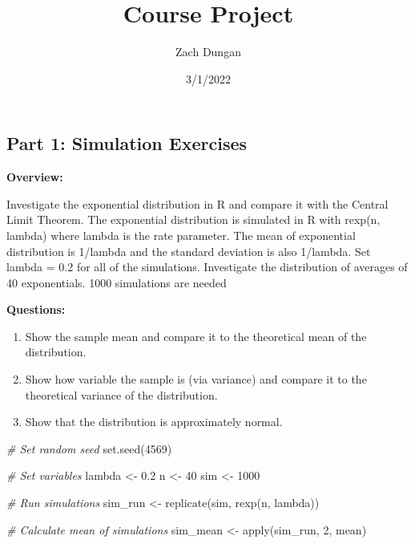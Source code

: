 \documentclass[
]{article}
\title{Course Project}
\author{Zach Dungan}
\date{3/1/2022}
\newenvironment{Shaded}{\begin{snugshade}}{\end{snugshade}}
\newcommand{\CommentTok}[1]{\textcolor[rgb]{0.56,0.35,0.01}{\textit{#1}}}
\newcommand{\DecValTok}[1]{\textcolor[rgb]{0.00,0.00,0.81}{#1}}
\newcommand{\FloatTok}[1]{\textcolor[rgb]{0.00,0.00,0.81}{#1}}
\newcommand{\FunctionTok}[1]{\textcolor[rgb]{0.00,0.00,0.00}{#1}}
\newcommand{\NormalTok}[1]{#1}
\newcommand{\OtherTok}[1]{\textcolor[rgb]{0.56,0.35,0.01}{#1}}
\begin{document}
\maketitle

\hypertarget{part-1-simulation-exercises}{%
\subsection{Part 1: Simulation
Exercises}\label{part-1-simulation-exercises}}

\textbf{Overview:}

Investigate the exponential distribution in R and compare it with the
Central Limit Theorem. The exponential distribution is simulated in R
with rexp(n, lambda) where lambda is the rate parameter. The mean of
exponential distribution is 1/lambda and the standard deviation is also
1/lambda. Set lambda = 0.2 for all of the simulations. Investigate the
distribution of averages of 40 exponentials. 1000 simulations are needed

\textbf{Questions:}

\begin{enumerate}
\def\labelenumi{\arabic{enumi}.}
\item
  Show the sample mean and compare it to the theoretical mean of the
  distribution.
\item
  Show how variable the sample is (via variance) and compare it to the
  theoretical variance of the distribution.
\item
  Show that the distribution is approximately normal.
\end{enumerate}

\begin{Shaded}
\begin{Highlighting}[]
\CommentTok{\# Set random seed}
\FunctionTok{set.seed}\NormalTok{(}\DecValTok{4569}\NormalTok{)}

\CommentTok{\# Set variables}
\NormalTok{lambda }\OtherTok{\textless{}{-}} \FloatTok{0.2}
\NormalTok{n }\OtherTok{\textless{}{-}} \DecValTok{40}
\NormalTok{sim }\OtherTok{\textless{}{-}} \DecValTok{1000}

\CommentTok{\# Run simulations}
\NormalTok{sim\_run }\OtherTok{\textless{}{-}} \FunctionTok{replicate}\NormalTok{(sim, }\FunctionTok{rexp}\NormalTok{(n, lambda))}

\CommentTok{\# Calculate mean of simulations}
\NormalTok{sim\_mean }\OtherTok{\textless{}{-}} \FunctionTok{apply}\NormalTok{(sim\_run, }\DecValTok{2}\NormalTok{, mean)}
\end{Highlighting}
\end{Shaded}
\end{document}
